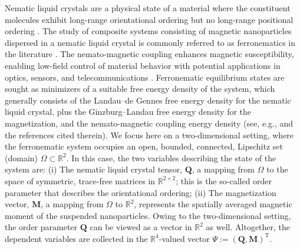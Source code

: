 \documentclass[a4paper,11pt]{article}
\theoremstyle{definition}
\theoremstyle{remark}
\numberwithin{equation}{section}
\newcommand{\Qvec}{{\boldsymbol Q}}
\newcommand{\Mvec}{{\boldsymbol M}}
\newcommand{\Real}{\mathbb{R}}
\newcommand{\tr}{^{\mathrm{T}}}
\begin{document}
Nematic liquid crystals are a physical state of a material where the constituent molecules exhibit long-range orientational ordering but no long-range positional ordering \cite{deGPr:95}. 
The study of composite systems consisting of magnetic nanoparticles dispersed in a nematic liquid crystal is commonly referred to as ferronematics in the literature \cite{Brochard_DE_Gennes_1970,Mertelj_Lisjak_Drofenik_Copic_2013}. 
The nemato-magnetic coupling enhances magnetic susceptibility, enabling low-field control of material behavior with potential applications in optics, sensors, and telecommunications \cite{Katona2014,Hess2015}. 
Ferronematic equilibrium states are sought as minimizers of a suitable free energy density of the system, which generally consists of the Landau--de Gennes free energy density for the nematic liquid crystal, plus the Ginzburg--Landau free energy density for the magnetization, and the nemato-magnetic coupling energy density (see, e.g.,
  \cite{Ferronematics_2D}    and the references cited therein). We focus here on a two-dimensional setting, where the ferronematic system occupies an open, bounded, connected, Lipschitz set (domain) $\Omega \subset \mathbb{R}^2$. In this case, the two variables describing the state of the system are: (i) The nematic liquid crystal tensor, $\Qvec$, a mapping from $\Omega$ to the space of symmetric, trace-free  matrices in $\Real^{2\times 2}$; this is the so-called order parameter that describes the orientational ordering; (ii) The magnetization vector, $\Mvec$, a mapping from $\Omega$ to $\Real^2$, represents the spatially averaged magnetic moment of the suspended nanoparticles. Owing to the two-dimensional setting, the order parameter $\Qvec$ can be viewed as a vector in $\Real^2$ as well. Altogether, the dependent variables are collected in the $\Real^4$-valued vector $\Psi:=(\Qvec,\Mvec)\tr$. 
\end{document}
